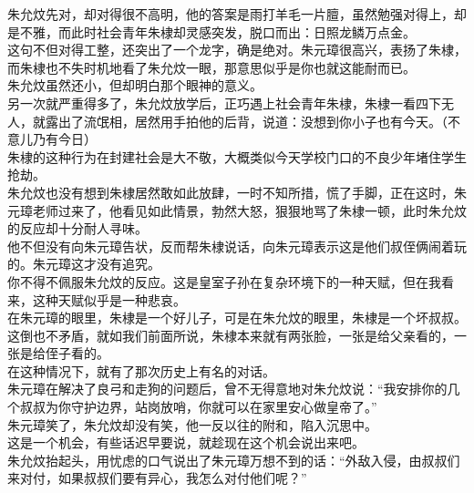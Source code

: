 \begin{multicols}{\theparacolNo}
朱允炆先对，却对得很不高明，他的答案是雨打羊毛一片膻，虽然勉强对得上，却是不雅，而此时社会青年朱棣却灵感突发，脱口而出：日照龙鳞万点金。\\

这句不但对得工整，还突出了一个龙字，确是绝对。朱元璋很高兴，表扬了朱棣，而朱棣也不失时机地看了朱允炆一眼，那意思似乎是你也就这能耐而已。\\

朱允炆虽然还小，但却明白那个眼神的意义。\\

另一次就严重得多了，朱允炆放学后，正巧遇上社会青年朱棣，朱棣一看四下无人，就露出了流氓相，居然用手拍他的后背，说道：没想到你小子也有今天。（不意儿乃有今日）\\

朱棣的这种行为在封建社会是大不敬，大概类似今天学校门口的不良少年堵住学生抢劫。\\

朱允炆也没有想到朱棣居然敢如此放肆，一时不知所措，慌了手脚，正在这时，朱元璋老师过来了，他看见如此情景，勃然大怒，狠狠地骂了朱棣一顿，此时朱允炆的反应却十分耐人寻味。\\

他不但没有向朱元璋告状，反而帮朱棣说话，向朱元璋表示这是他们叔侄俩闹着玩的。朱元璋这才没有追究。\\

你不得不佩服朱允炆的反应。这是皇室子孙在复杂环境下的一种天赋，但在我看来，这种天赋似乎是一种悲哀。\\

在朱元璋的眼里，朱棣是一个好儿子，可是在朱允炆的眼里，朱棣是一个坏叔叔。这倒也不矛盾，就如我们前面所说，朱棣本来就有两张脸，一张是给父亲看的，一张是给侄子看的。\\

在这种情况下，就有了那次历史上有名的对话。\\

朱元璋在解决了良弓和走狗的问题后，曾不无得意地对朱允炆说：“我安排你的几个叔叔为你守护边界，站岗放哨，你就可以在家里安心做皇帝了。”\\

朱元璋笑了，朱允炆却没有笑，他一反以往的附和，陷入沉思中。\\

这是一个机会，有些话迟早要说，就趁现在这个机会说出来吧。\\

朱允炆抬起头，用忧虑的口气说出了朱元璋万想不到的话：“外敌入侵，由叔叔们来对付，如果叔叔们要有异心，我怎么对付他们呢？”\\


\end{multicols}
